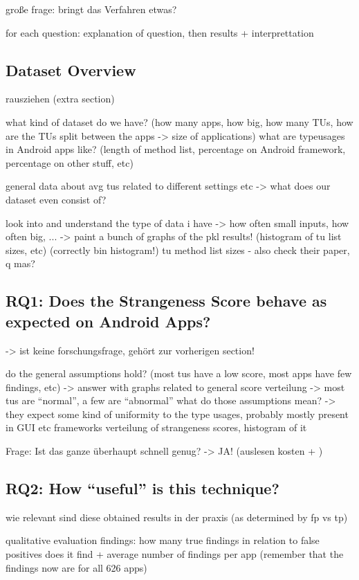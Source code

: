 große frage: bringt das Verfahren etwas?

for each question: explanation of question, then results + interprettation
\subsection{Dataset Overview}
rausziehen (extra section)

what kind of dataset do we have? (how many apps, how big, how many TUs, how are the TUs split between the apps -> size of applications)
what are typeusages in Android apps like? (length of method list, percentage on Android framework, percentage on other stuff, etc) 

general data about avg tus related to different settings etc -> what does our dataset even consist of?

look into and understand the type of data i have -> how often small inputs, how often big, ...
-> paint a bunch of graphs of the pkl results! (histogram of tu list sizes,  etc) (correctly bin histogram!)
 tu method list sizes - also check their paper, q mas?

\subsection{RQ1: Does the Strangeness Score behave as expected on Android Apps?}
-> ist keine forschungsfrage, gehört zur vorherigen section!

do the general assumptions hold? (most tus have a low score, most apps have few findings, etc)
    -> answer with graphs related to general score verteilung
    -> most tus are ``normal'', a few are ``abnormal''
    what do those assumptions mean? -> they expect some kind of uniformity to the type usages, probably mostly present in GUI etc frameworks
verteilung of strangeness scores, histogram of it

Frage: Ist das ganze überhaupt schnell genug?
-> JA!
(auslesen kosten + )

\subsection{RQ2: How ``useful'' is this technique?}
wie relevant sind diese obtained results in der praxis (as determined by fp vs tp)

qualitative evaluation findings:
how many true findings in relation to false positives does it find + average number of findings per app (remember that the findings now are for all 626 apps)

